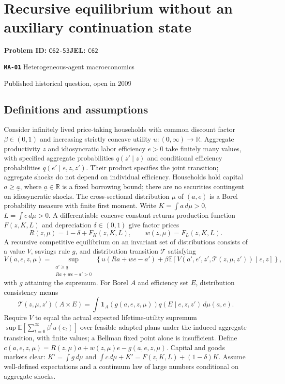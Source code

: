 \documentclass[11pt,a4paper]{article}
\newcommand{\R}{\mathbb R}
\newcommand{\E}{\mathbb E}
\newcommand{\ind}{\mathbf 1}
\newcommand{\entrymeta}[3]{{\sffamily\small\color{muted}\textbf{\texttt{#1}}\quad|\quad #2\par #3\par}}
\begin{document}
\section*{Recursive equilibrium without an auxiliary continuation state}
\textbf{Problem ID:} \texttt{C62-53}\quad \textbf{JEL:} \texttt{C62}\par
\label{problem:OP-0582}
\label{beyond:MA-01}
\entrymeta{MA-01}{Heterogeneous-agent macroeconomics}{Published historical question, open in 2009}
\subsection*{Definitions and assumptions}
Consider infinitely lived price-taking households with common discount factor $\beta\in(0,1)$ and increasing strictly concave utility $u:(0,\infty)\to\R$. Aggregate productivity $z$ and idiosyncratic labor efficiency $e>0$ take finitely many values, with specified aggregate probabilities $q(z'\mid z)$ and conditional efficiency probabilities $q(e'\mid e,z,z')$. Their product specifies the joint transition; aggregate shocks do not depend on individual efficiency. Households hold capital $a\ge\underline a$, where $\underline a\in\R$ is a fixed borrowing bound; there are no securities contingent on idiosyncratic shocks. The cross-sectional distribution $\mu$ of $(a,e)$ is a Borel probability measure with finite first moment. Write $K=\int a\,d\mu>0$, $L=\int e\,d\mu>0$. A differentiable concave constant-returns production function $F(z,K,L)$ and depreciation $\delta\in(0,1)$ give factor prices
\[
 R(z,\mu)=1-\delta+F_K(z,K,L),\qquad w(z,\mu)=F_L(z,K,L).
\]
A recursive competitive equilibrium on an invariant set of distributions consists of a value $V$, savings rule $g$, and distribution transition $\mathcal T$ satisfying
\[
 V(a,e,z,\mu)=\sup_{\substack{a'\ge\underline a\\Ra+we-a'>0}}\left\{u(Ra+we-a')+
 \beta\E[V(a',e',z',\mathcal T(z,\mu,z'))\mid e,z]\right\},
\]
with $g$ attaining the supremum. For Borel $A$ and efficiency set $E$, distribution consistency means
\[
 \mathcal T(z,\mu,z')(A\times E)=\int \ind_{A}(g(a,e,z,\mu))q(E\mid e,z,z')\,d\mu(a,e).
\]
Require $V$ to equal the actual expected lifetime-utility supremum $\sup\E[\sum_{t=0}^{\infty}\beta^t u(c_t)]$ over feasible adapted plans under the induced aggregate transition, with finite values; a Bellman fixed point alone is insufficient. Define $c(a,e,z,\mu)=R(z,\mu)a+w(z,\mu)e-g(a,e,z,\mu)$. Capital and goods markets clear: $K'=\int g\,d\mu$ and $\int c\,d\mu+K'=F(z,K,L)+(1-\delta)K$. Assume well-defined expectations and a continuum law of large numbers conditional on aggregate shocks.
\end{document}
